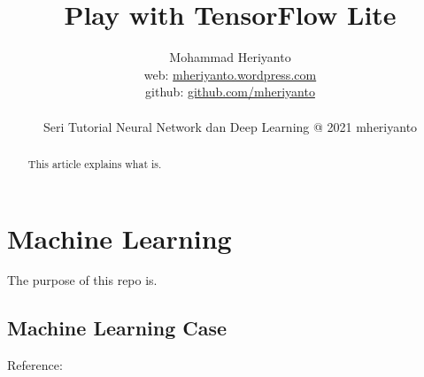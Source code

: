 \documentclass[12pt,oneside,a4paper]{article}
\begin{document}
\title{Play with TensorFlow Lite}
\author{Mohammad Heriyanto \\web: \href{https://mheriyanto.wordpress.com//}{mheriyanto.wordpress.com} \\ github: \href{https://github.com/mheriyanto}{github.com/mheriyanto} \\~\\ Seri Tutorial Neural Network dan Deep Learning @ 2021 mheriyanto}
   
\maketitle

\begin{abstract}
This article explains what is.
\end{abstract}

\section{Machine Learning}
The purpose of this repo is.

\subsection{Machine Learning Case}

Reference: 
\end{document}
